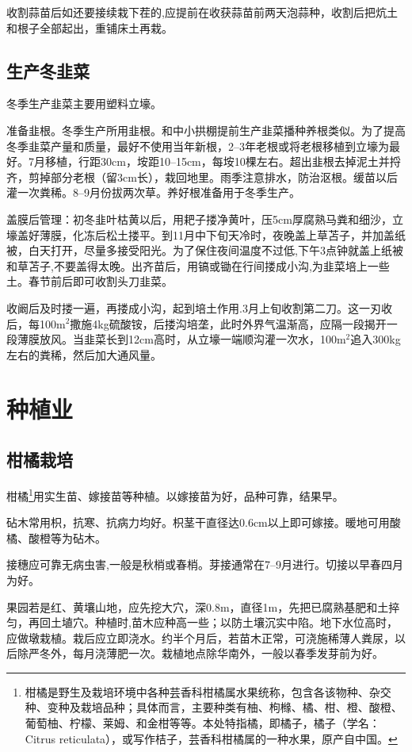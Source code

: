 \documentclass{ctexbook}
\begin{document}
收割蒜苗后如还要接续栽下茬的,应提前在收获蒜苗前两天泡蒜种，收割后把炕土和根子全部起出，重铺床土再栽。
\subsection{生产冬韭菜}
冬季生产韭菜主要用塑料立壕。

准备韭根。冬季生产所用韭根。和中小拱棚提前生产韭菜播种养根类似。为了提高冬季韭菜产量和质量，最好不使用当年新根，2--3年老根或将老根移植到立壕为最好。7月移植，行距30cm，垵距10--15cm，每垵10棵左右。超出韭根去掉泥土并捋齐，剪掉部分老根（留3cm长），栽回地里。雨季注意排水，防治沤根。缓苗以后灌一次粪稀。8--9月份拔两次草。养好根准备用于冬季生产。

盖膜后管理：初冬韭叶枯黄以后，用耙子搂净黄叶，压5cm厚腐熟马粪和细沙，立壕盖好薄膜，化冻后松土搂平。到11月中下旬天冷时，夜晚盖上草苫子，并加盖纸被，白天打开，尽量多接受阳光。为了保住夜间温度不过低,下午3点钟就盖上纸被和草苫子,不要盖得太晚。出齐苗后，用镐或锄在行间搂成小沟,为韭菜培上一些土。春节前后即可收割头刀韭菜。

收阚后及时搂一遍，再搂成小沟，起到培土作用.3月上旬收割第二刀。这一刃收后，每100m$^2$撒施4kg硫酸铵，后搂沟培垄，此时外界气温渐高，应隔一段揭开一段薄膜放风。当韭菜长到12cm高时，从立壕一端顺沟灌一次水，100m$^2$追入300kg左右的粪稀，然后加大通风量。
\section{种植业}
\subsection{柑橘栽培}
柑橘\footnote{柑橘是野生及栽培环境中各种芸香科柑橘属水果统称，包含各该物种、杂交种、变种及栽培品种；具体而言，主要种类有柚、枸橼、橘、柑、橙、酸橙、葡萄柚、柠檬、莱姆、和金柑等等。本处特指橘，即橘子，橘子（学名：Citrus reticulata），或写作桔子，芸香科柑橘属的一种水果，原产自中国。}用实生苗、嫁接苗等种植。以嫁接苗为好，品种可靠，结果早。

砧木常用枳，抗寒、抗病力均好。枳茎干直径达0.6cm以上即可嫁接。暖地可用酸橘、酸橙等为砧木。

接穗应可靠无病虫害,一般是秋梢或春梢。芽接通常在7--9月进行。切接以早春四月为好。

果园若是红、黄壤山地，应先挖大穴，深0.8m，直径1m，先把已腐熟基肥和土捽匀，再回土埴穴。种植时,苗木应种高一些；以防土壤沉实中陷。地下水位高时，应做墩栽植。栽后应立即浇水。约半个月后，若苗木正常，可浇施稀薄人粪尿，以后除严冬外，每月浇薄肥一次。栽植地点除华南外，一般以春季发芽前为好。
\end{document}
